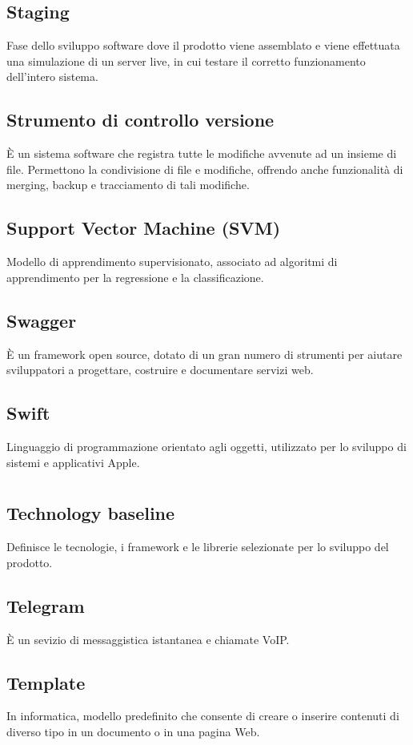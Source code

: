 	\subsection*{Staging}
	Fase dello sviluppo software dove il prodotto viene assemblato e viene effettuata una simulazione di un server live, in cui testare il corretto funzionamento dell'intero sistema.
	\subsection*{Strumento di controllo versione}
	È un sistema software che registra tutte le modifiche avvenute ad un insieme di file. Permettono la condivisione di file e modifiche, offrendo anche funzionalità di merging, backup e tracciamento di tali modifiche.
	\subsection*{Support Vector Machine (SVM)}
	Modello di apprendimento supervisionato, associato ad algoritmi di apprendimento per la regressione e la classificazione.
	\subsection*{Swagger}
	È un framework open source, dotato di un gran numero di strumenti per aiutare sviluppatori a progettare, costruire e documentare servizi web.
	\subsection*{Swift}
	Linguaggio di programmazione orientato agli oggetti, utilizzato per lo sviluppo di sistemi e applicativi Apple.
\pagebreak
\section[T]{}
	\subsection*{Technology baseline}
	Definisce le tecnologie, i framework e le librerie selezionate per lo sviluppo del prodotto.
	\subsection*{Telegram}
	È un sevizio di messaggistica istantanea e chiamate VoIP.
	\subsection*{Template}
	In informatica, modello predefinito che consente di creare o inserire contenuti di diverso tipo in un documento o in una pagina Web.
